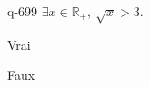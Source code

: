 \begin{truefalse}{q-699}
$\exists x \in \mathbb R_+,\: \sqrt x > 3$.
\item* Vrai
\item Faux
\end{truefalse}

